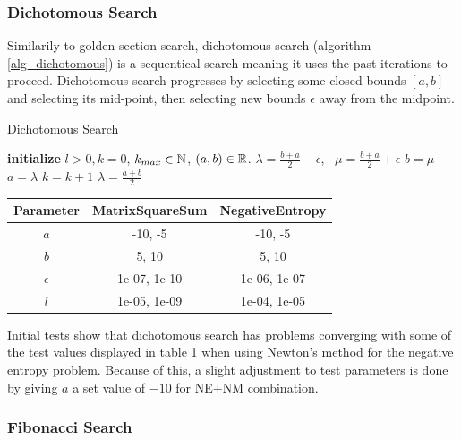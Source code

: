 \documentclass[a4paper,english,titlepage,12pt]{article}
\newcommand{\R}{\ensuremath\mathbb{R}}
\newcommand{\N}{\ensuremath\mathbb{N}}
\begin{document}
\subsubsection{Dichotomous Search}


Similarily to golden section search, dichotomous search (algorithm \ref{alg_dichotomous}) is a sequentical search meaning it uses the past iterations to proceed. Dichotomous search progresses by selecting some closed bounds $[a, b]$ and selecting its mid-point, then selecting new bounds $\epsilon$ away from the midpoint. \cite{book:nonlinear_programming}

\begin{algorithm}[H]
\caption{Dichotomous Search}
\label{alg_dichotomous}
\begin{algorithmic}[1]
\STATE \textbf{initialize} $l > 0, k = 0$, $k_{max} \in \N$, $(a, b) \in \R$.
    \STATE $\lambda = \frac{b + a}{2} - \epsilon$, \ $\mu = \frac{b + a}{2} + \epsilon$
    \IF{$\theta(\lambda) < \theta(\mu)$}
        \STATE $b = \mu$
    \ELSE
        \STATE $a = \lambda$
    \ENDIF
    \STATE $k = k + 1$
\ENDWHILE
\RETURN $\lambda = \frac{a + b}{2}$
\end{algorithmic}
\end{algorithm}

\begin{table}[H]
\label{tab:params_DichotomousSearch}
\centering
{}
\begin{tabular}{|c|c|c|}
\hline
\rowcolor{gray!25}
Parameter & MatrixSquareSum & NegativeEntropy \\
\hline
$a$ & -10, -5 & -10, -5 \\
$b$ & 5, 10 & 5, 10 \\
$\epsilon$ & 1e-07, 1e-10 & 1e-06, 1e-07 \\
$l$ & 1e-05, 1e-09 & 1e-04, 1e-05 \\
\hline
\end{tabular}
\end{table}

Initial tests show that dichotomous search has problems converging with some of the test values displayed in table \ref{tab:params_DichotomousSearch} when using Newton's method for the negative entropy problem. Because of this, a slight adjustment to test parameters is done by giving $a$ a set value of $-10$ for NE+NM combination.


\subsubsection{Fibonacci Search}
\end{document}
